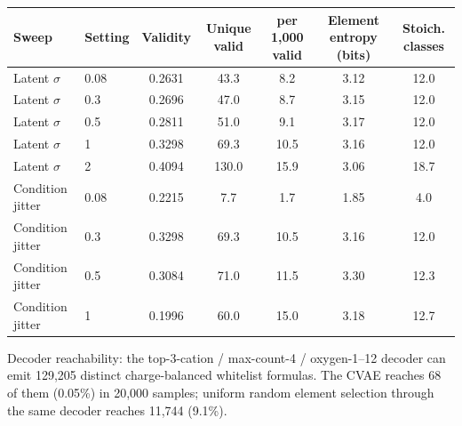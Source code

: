 \begin{tabular}{llccccc}
\toprule
Sweep & Setting & Validity & Unique valid & per 1{,}000 valid & Element entropy (bits) & Stoich. classes \\
\midrule
Latent $\sigma$ & 0.08 & 0.2631 & 43.3 & 8.2 & 3.12 & 12.0 \\
Latent $\sigma$ & 0.3 & 0.2696 & 47.0 & 8.7 & 3.15 & 12.0 \\
Latent $\sigma$ & 0.5 & 0.2811 & 51.0 & 9.1 & 3.17 & 12.0 \\
Latent $\sigma$ & 1 & 0.3298 & 69.3 & 10.5 & 3.16 & 12.0 \\
Latent $\sigma$ & 2 & 0.4094 & 130.0 & 15.9 & 3.06 & 18.7 \\
\midrule
Condition jitter & 0.08 & 0.2215 & 7.7 & 1.7 & 1.85 & 4.0 \\
Condition jitter & 0.3 & 0.3298 & 69.3 & 10.5 & 3.16 & 12.0 \\
Condition jitter & 0.5 & 0.3084 & 71.0 & 11.5 & 3.30 & 12.3 \\
Condition jitter & 1 & 0.1996 & 60.0 & 15.0 & 3.18 & 12.7 \\
\bottomrule
\end{tabular}
\vspace{0.3em}\footnotesize{Decoder reachability: the top-3-cation / max-count-4 / oxygen-1--12 decoder can emit 129,205 distinct charge-balanced whitelist formulas. The CVAE reaches 68 of them (0.05\%) in 20{,}000 samples; uniform random element selection through the same decoder reaches 11,744 (9.1\%).}
